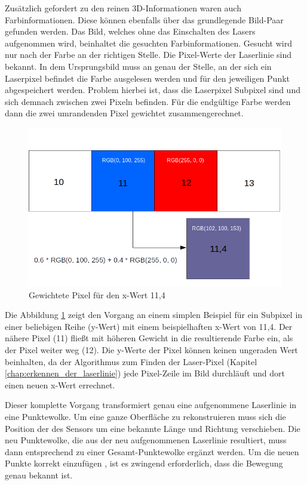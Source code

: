 	Zusätzlich gefordert zu den reinen 3D-Informationen waren auch Farbinformationen. Diese können ebenfalls über das grundlegende Bild-Paar gefunden werden. Das Bild, welches ohne das Einschalten des Lasers aufgenommen wird, beinhaltet die gesuchten Farbinformationen. Gesucht wird nur nach der Farbe an der richtigen Stelle. Die Pixel-Werte der Laserlinie sind bekannt. In dem Ursprungsbild muss an genau der Stelle, an der sich ein Laserpixel befindet die Farbe ausgelesen werden und für den jeweiligen Punkt abgespeichert werden. Problem hierbei ist, dass die Laserpixel Subpixel sind und sich demnach zwischen zwei Pixeln befinden. Für die endgültige Farbe werden dann die zwei umrandenden Pixel gewichtet zusammengerechnet.
	\begin{figure}
		\centering
		\includegraphics[width=0.85\linewidth]{img/hauptteil/bildverarbeitung/weighted_pixel.png}
		\caption{Gewichtete Pixel für den x-Wert 11,4}
		\label{fig:weighted_pixel}
	\end{figure}
	Die Abbildung \ref{fig:weighted_pixel} zeigt den Vorgang an einem simplen Beispiel für ein Subpixel in einer beliebigen Reihe (y-Wert) mit einem beispielhaften x-Wert von 11,4. Der nähere Pixel (11) fließt mit höheren Gewicht in die resultierende Farbe ein, als der Pixel weiter weg (12). Die y-Werte der Pixel können keinen ungeraden Wert beinhalten, da der Algorithmus zum Finden der Laser-Pixel (Kapitel \ref{chap:erkennen_der_laserlinie}) jede Pixel-Zeile im Bild durchläuft und dort einen neuen x-Wert errechnet.
	
	Dieser komplette Vorgang transformiert genau eine aufgenommene Laserlinie in eine Punktewolke. Um eine ganze Oberfläche zu rekonstruieren muss sich die Position der des Sensors um eine bekannte Länge und Richtung verschieben. Die neu Punktewolke, die aus der neu aufgenommenen Laserlinie resultiert, muss dann entsprechend zu einer Gesamt-Punktewolke ergänzt werden. Um die neuen Punkte korrekt einzufügen , ist es zwingend erforderlich, dass die Bewegung genau bekannt ist. 
	
